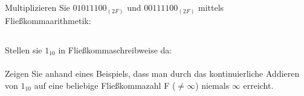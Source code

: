 \subsection{}
Multiplizieren Sie $01011100_{(2F)}$ und $00111100_{(2F)}$ mittels Fließkommaarithmetik:\\
\subsection{}
Stellen sie $1_{10}$ in Fließkommaschreibweise da:\\
\\[0.3cm]
Zeigen Sie anhand eines Beispiels, dass man durch das kontinuierliche Addieren von $1_{10}$ auf eine beliebige Fließkommazahl F ($\neq \infty$) niemals $\infty$ erreicht.\\
